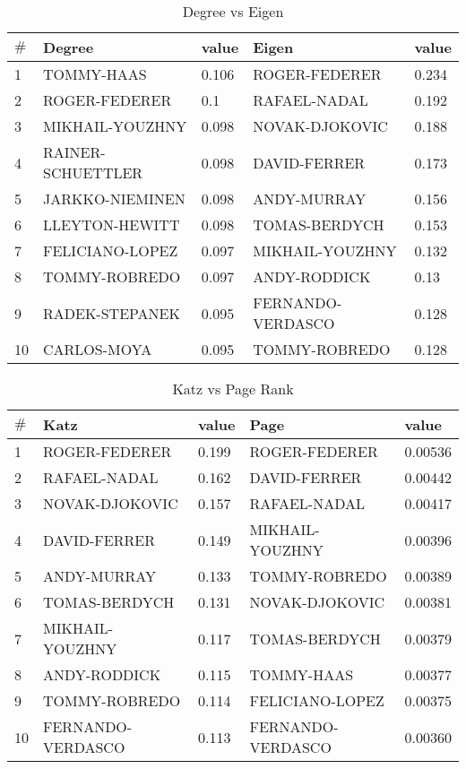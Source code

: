 \documentclass[runningheads]{llncs}
\begin{document}
\begin{table}
\centering
\caption{Degree vs Eigen}\label{tab_degree_vs_eigen}
\begin{tabular}{|l|l|l|l|l|}
\hline
$\#$ & Degree & value & Eigen & value \\ \hline
1 & TOMMY-HAAS & 0.106 & ROGER-FEDERER & 0.234 \\ \hline
2 & ROGER-FEDERER & 0.1 & RAFAEL-NADAL & 0.192 \\ \hline
3 & MIKHAIL-YOUZHNY & 0.098 & NOVAK-DJOKOVIC & 0.188 \\ \hline
4 & RAINER-SCHUETTLER & 0.098 & DAVID-FERRER & 0.173 \\ \hline
5 & JARKKO-NIEMINEN & 0.098 & ANDY-MURRAY & 0.156 \\ \hline
6 & LLEYTON-HEWITT & 0.098 & TOMAS-BERDYCH & 0.153 \\ \hline
7 & FELICIANO-LOPEZ & 0.097 & MIKHAIL-YOUZHNY & 0.132 \\ \hline
8 & TOMMY-ROBREDO & 0.097 & ANDY-RODDICK & 0.13 \\ \hline
9 & RADEK-STEPANEK & 0.095 & FERNANDO-VERDASCO & 0.128 \\ \hline
10 & CARLOS-MOYA & 0.095 & TOMMY-ROBREDO & 0.128 \\ \hline

\end{tabular}
\end{table}


\begin{table}
\centering
\caption{Katz vs Page Rank}\label{tab_katz_vs_page}
\begin{tabular}{|l|l|l|l|l|}
\hline
$\#$ & Katz & value & Page & value \\ \hline
1 & ROGER-FEDERER & 0.199 & ROGER-FEDERER & 0.00536 \\ \hline
2 & RAFAEL-NADAL & 0.162 & DAVID-FERRER & 0.00442 \\ \hline
3 & NOVAK-DJOKOVIC & 0.157 & RAFAEL-NADAL & 0.00417 \\ \hline
4 & DAVID-FERRER & 0.149 & MIKHAIL-YOUZHNY & 0.00396 \\ \hline
5 & ANDY-MURRAY & 0.133 & TOMMY-ROBREDO & 0.00389 \\ \hline
6 & TOMAS-BERDYCH & 0.131 & NOVAK-DJOKOVIC & 0.00381 \\ \hline
7 & MIKHAIL-YOUZHNY & 0.117 & TOMAS-BERDYCH & 0.00379 \\ \hline
8 & ANDY-RODDICK & 0.115 & TOMMY-HAAS & 0.00377 \\ \hline
9 & TOMMY-ROBREDO & 0.114 & FELICIANO-LOPEZ & 0.00375 \\ \hline
10 & FERNANDO-VERDASCO & 0.113 & FERNANDO-VERDASCO & 0.00360 \\ \hline

\end{tabular}
\end{table}
\end{document}
